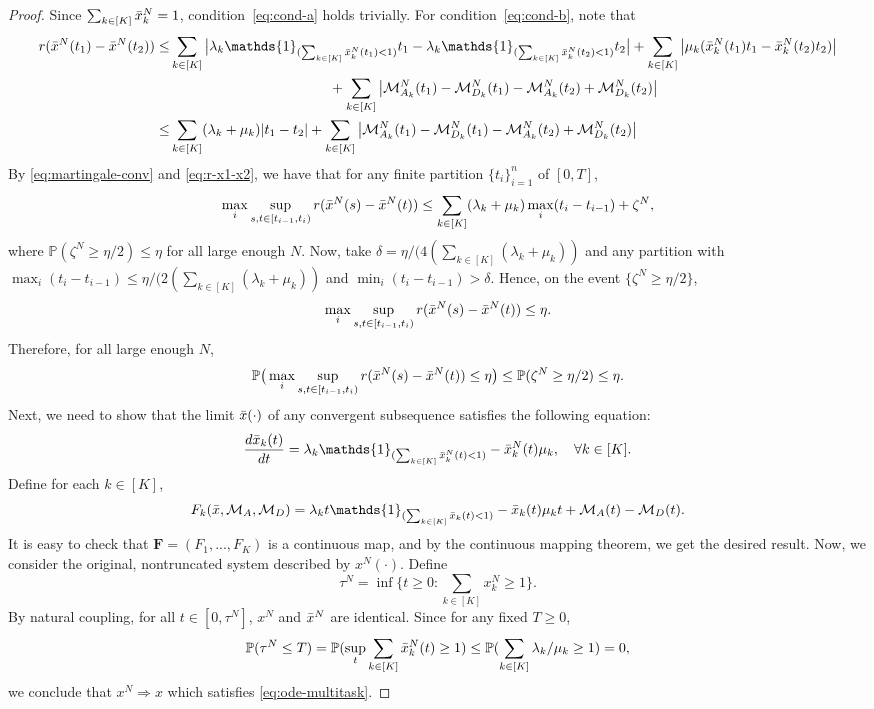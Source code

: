 \documentclass[11pt, reqno]{article}
\numberwithin{equation}{section}
\numberwithin{theorem}{section}
\newcommand{\PP}{\mathbb{P}}  				%
\begin{document}
\begin{proof}
Since $\sum_{k\in[K]}\Bar{x}^N_k=1$, condition~\eqref{eq:cond-a} holds trivially. For condition~\eqref{eq:cond-b}, note that
\begin{equation}\label{eq:r-x1-x2}
    \begin{split}
        r(\Bar{x}^N(t_1)-\Bar{x}^N(t_2))\leq &\sum_{k\in[K]}\big|\lambda_k\mathds{1}_{(\sum_{k\in[K]}\Bar{x}^N_k(t_1)<1)}t_1-\lambda_k\mathds{1}_{(\sum_{k\in[K]}\Bar{x}^N_k(t_2)<1)}t_2\big|
        +\sum_{k\in[K]}\big|\mu_k(\Bar{x}^N_k(t_1)t_1-\Bar{x}^N_k(t_2)t_2)\big|\\
        &\hspace{4cm}+\sum_{k\in[K]}\big|\mathcal{M}^N_{A_k}(t_1)-\mathcal{M}^N_{D_k}(t_1)-\mathcal{M}^N_{A_k}(t_2)+\mathcal{M}^N_{D_k}(t_2)\big|\\
        \leq & \sum_{k\in[K]}(\lambda_k+\mu_k)|t_1-t_2|
        +\sum_{k\in[K]}\big|\mathcal{M}^N_{A_k}(t_1)-\mathcal{M}^N_{D_k}(t_1)-\mathcal{M}^N_{A_k}(t_2)+\mathcal{M}^N_{D_k}(t_2)\big|
    \end{split}
\end{equation}
By \eqref{eq:martingale-conv} and \eqref{eq:r-x1-x2}, we have that for any finite partition $\{t_i\}_{i=1}^n$ of $[0,T]$,
$$\max_{i}\sup_{s,t\in[t_{i-1},t_i)}r(\Bar{x}^N(s)-\Bar{x}^N(t))\leq \sum_{k\in[K]}(\lambda_k+\mu_k)\max_{i}(t_i-t_{i-1})+\zeta^N,$$
where $\PP(\zeta^N\geq \eta/2)\leq \eta$ for all large enough $N$. Now, take $\delta=\eta/(4(\sum_{k\in[K]}(\lambda_k+\mu_k))$ and any partition with $\max_{i}(t_i-t_{i-1})\leq \eta / (2(\sum_{k\in[K]}(\lambda_k+\mu_k))$ and $\min_{i}(t_i-t_{i-1})>\delta$. Hence, on the event $\{\zeta^N\geq \eta/2\}$, 
$$\max_{i}\sup_{s,t\in[t_{i-1},t_i)}r(\Bar{x}^N(s)-\Bar{x}^N(t))\leq\eta.$$
Therefore, for all large enough $N$,
$$\PP\big( \max_{i}\sup_{s,t\in[t_{i-1},t_i)}r(\Bar{x}^N(s)-\Bar{x}^N(t))\leq\eta\big)\leq \PP(\zeta^N\geq \eta/2)\leq \eta.$$
Next, we need to show that the limit $\Bar{x}(\cdot)$ of any convergent subsequence satisfies the following equation:
$$\frac{d\Bar{x}_k(t)}{dt}=\lambda_k  \mathds{1}_{(\sum_{k\in[K]}\Bar{x}^N_k(t)<1)}- \Bar{x}^N_k(t) \mu_k,\quad \forall k\in[K].$$
Define for each $k\in[K]$,
$$F_k(\Bar{x},\mathcal{M}_A,\mathcal{M}_D)=\lambda_k t \mathds{1}_{(\sum_{k\in[K]}\Bar{x}_k(t)<1)}- \Bar{x}_k(t) \mu_k t + \mathcal{M}_A(t)-\mathcal{M}_D(t).$$
It is easy to check that $\mathbf{F}=(F_1,...,F_K)$ is a continuous map, and by the continuous mapping theorem, we get the desired result. Now, we consider the original, nontruncated system described by $x^N(\cdot)$. Define 
$$\tau^N=\inf \Big\{t\geq 0: \sum_{k\in[K]}x^N_k\geq 1\Big\}.$$
By natural coupling, for all $t\in[0,\tau^N]$, $x^N$ and $\Bar{x}^N$ are identical. 
Since for any fixed $T\geq 0$, 
\begin{equation}
    \begin{split}
        \PP(\tau^N\leq T)=\PP(\sup_{t}\sum_{k\in[K]}\Bar{x}^N_k(t)\geq 1)\leq \PP(\sum_{k\in[K]}\lambda_k/\mu_k\geq 1)=0,
    \end{split}
\end{equation}
we conclude that $x^N\Rightarrow x$ which satisfies \eqref{eq:ode-multitask}. 
\end{proof}
\end{document}

